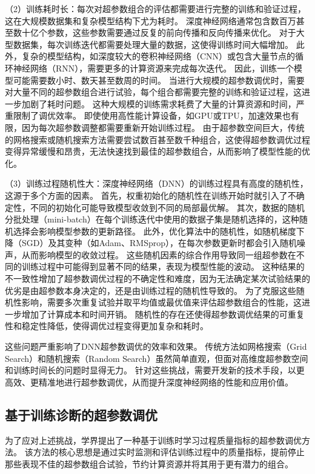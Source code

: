 （2）训练耗时长：每次对超参数组合的评估都需要进行完整的训练和验证过程，这在大规模数据集和复杂模型结构下尤为耗时。
深度神经网络通常包含数百万甚至数十亿个参数，这些参数需要通过反复的前向传播和反向传播来优化。
对于大型数据集，每次训练迭代都需要处理大量的数据，这使得训练时间大幅增加。
此外，复杂的模型结构，如深度较大的卷积神经网络（CNN）或包含大量节点的循环神经网络（RNN），需要更多的计算资源来完成每次迭代。
因此，训练一个模型可能需要数小时、数天甚至数周的时间。
当进行大规模的超参数调优时，需要对大量不同的超参数组合进行试验，每个组合都需要完整的训练和验证过程，这进一步加剧了耗时问题。
这种大规模的训练需求耗费了大量的计算资源和时间，严重限制了调优效率。
即使使用高性能计算设备，如GPU或TPU，加速效果也有限，因为每次超参数调整都需要重新开始训练过程。
由于超参数空间巨大，传统的网格搜索或随机搜索方法需要尝试数百甚至数千种组合，这使得超参数调优过程变得异常缓慢和昂贵，无法快速找到最佳的超参数组合，从而影响了模型性能的优化。

（3）训练过程随机性大：深度神经网络（DNN）的训练过程具有高度的随机性，这源于多个方面的因素。
首先，权重初始化的随机性在训练开始时就引入了不确定性，不同的初始化可能导致模型收敛到不同的局部最优解。
其次，数据的随机分批处理（mini-batch）在每个训练迭代中使用的数据子集是随机选择的，这种随机选择会影响模型参数的更新路径。
此外，优化算法中的随机性，如随机梯度下降（SGD）及其变种（如Adam、RMSprop），在每次参数更新时都会引入随机噪声，从而影响模型的收敛过程。
这些随机因素的综合作用导致同一组超参数在不同的训练过程中可能得到显著不同的结果，表现为模型性能的波动。
这种结果的不一致性增加了超参数调优过程的不确定性和难度，因为无法确定某次试验结果的优劣是由超参数本身决定的，还是由训练过程的随机性导致的。
为了克服这些随机性影响，需要多次重复试验并取平均值或最优值来评估超参数组合的性能，这进一步增加了计算成本和时间开销。
随机性的存在还使得超参数调优结果的可重复性和稳定性降低，使得调优过程变得更加复杂和耗时。

这些问题严重影响了DNN超参数调优的效率和效果。
传统方法如网格搜索（Grid Search）和随机搜索（Random Search）虽然简单直观，但面对高维度超参数空间和训练时间长的问题时显得无力。
针对这些挑战，需要开发新的技术手段，以更高效、更精准地进行超参数调优，从而提升深度神经网络的性能和应用价值。

\subsection{基于训练诊断的超参数调优}

为了应对上述挑战，学界提出了一种基于训练时学习过程质量指标的超参数调优方法\cite{Pei24}。
该方法的核心思想是通过实时监测和评估训练过程中的质量指标，提前停止那些表现不佳的超参数组合试验，节约计算资源并将其用于更有潜力的组合。

